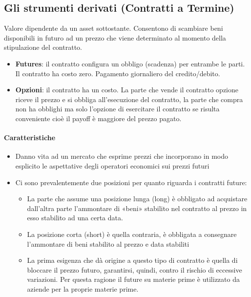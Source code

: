 \documentclass[12pt]{article}
\begin{document}
\subsection{Gli strumenti derivati (Contratti a Termine)}
Valore dipendente da un asset sottostante. Consentono di scambiare beni disponibili in futuro ad un prezzo che viene determinato al momento della stipulazione del contratto.
\begin{itemize}
    \item \textbf{Futures}: il contratto configura un obbligo (scadenza) per entrambe le parti. Il contratto ha costo zero. Pagamento giornaliero del credito/debito.
    \item \textbf{Opzioni}: il contratto ha un costo. La parte che vende il contratto opzione riceve il prezzo e si obbliga all'esecuzione del contratto, la parte che compra non ha obblighi ma solo l'opzione di esercitare il contratto se risulta conveniente cioè il payoff è maggiore del prezzo pagato.
\end{itemize}
\paragraph{Caratteristiche}
\begin{itemize}
    \item Danno vita ad un mercato che esprime prezzi che incorporano in modo esplicito le aspettative degli operatori economici sui prezzi futuri
    \item Ci sono prevalentemente due posizioni per quanto riguarda i contratti future:
          \begin{itemize}
              \item  La parte che assume una posizione lunga (long) è obbligato ad acquistare dall’altra parte l’ammontare di «beni» stabilito nel contratto al prezzo in esso stabilito ad una certa data.
              \item La posizione corta (short) è quella contraria, è obbligata a consegnare l’ammontare di beni stabilito al prezzo e data stabiliti
              \item La prima esigenza che dà origine a questo tipo di contratto è quella di bloccare il prezzo futuro, garantirsi, quindi, contro il rischio di eccessive variazioni. Per questa ragione il future su materie prime è utilizzato da aziende per la proprie materie prime.
          \end{itemize}
\end{itemize}
\end{document}
